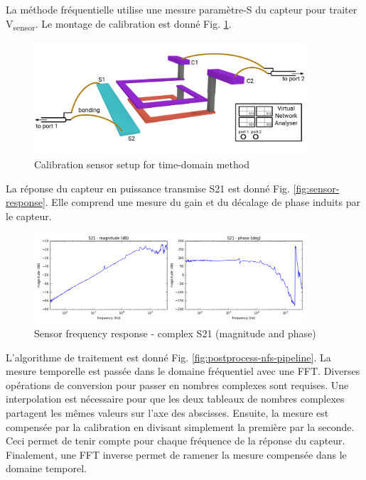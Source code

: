La méthode fréquentielle utilise une mesure paramètre-S du capteur pour traiter V\textsubscript{sensor}.
Le montage de calibration est donné Fig. \ref{fig:calibration-sensor-rf}.

\begin{figure}[!h]
  \centering
  \includegraphics[width=0.9\textwidth]{src/1/figures/sensor_measurement_setup_rf.pdf}
  \caption{Calibration sensor setup for time-domain method}
  \label{fig:calibration-sensor-rf}
\end{figure}

La réponse du capteur en puissance transmise S21 est donné Fig. \ref{fig:sensor-response}.
Elle comprend une mesure du gain et du décalage de phase induits par le capteur.

\begin{figure}[!h]
  \centering
  \includegraphics[width=0.9\textwidth]{src/1/figures/s21_freq_response.png}
  \caption{Sensor frequency response - complex S21 (magnitude and phase)}
  \label{fig:s21-response-complex}
\end{figure}

L'algorithme de traitement est donné Fig. \ref{fig:postprocess-nfs-pipeline}.
La mesure temporelle est passée dans le domaine fréquentiel avec une FFT.
Diverses opérations de conversion pour passer en nombres complexes sont requises.
Une interpolation est nécessaire pour que les deux tableaux de nombres complexes partagent les mêmes valeurs sur l'axe des abscisses.
Ensuite, la mesure est compensée par la calibration en divisant simplement la première par la seconde.
Ceci permet de tenir compte pour chaque fréquence de la réponse du capteur.
Finalement, une FFT inverse permet de ramener la mesure compensée dans le domaine temporel.


